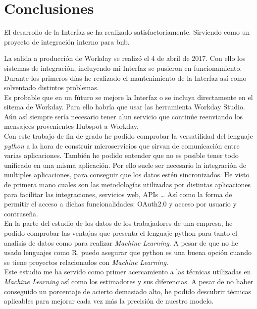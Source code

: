 \chapter{Conclusiones}

El desarrollo de la Interfaz se ha realizado satisfactoriamente. Sirviendo como un proyecto de integración interno para \acrshort{bnb}.

La salida a producción de Workday se realizó el 4 de abril de 2017. Con ello los sistemas de integración, incluyendo mi Interfaz se pusieron en funcionamiento.\\

Durante los primeros días he realizado el mantenimiento de la Interfaz así como solventado distintos problemas.\\

Es probable que en un fúturo se mejore la Interfaz o se incluya directamente en el sitema de Workday.
Para ello habría que usar las herramienta Workday Studio.
Aún así siempre sería necesario tener alun servicio que continúe reenviando los mensajees provenientes Hubspot a Workday. \\


Con este trabajo de fin de grado he podido comprobar la versatilidad del lenguaje \textit{python} a la hora de construir microservicios que sirvan de comunicación entre varias aplicaciones.
También he podido entender que no es posible tener todo unificado en una misma aplicación. Por ello suele ser necesario la integración de multiples aplicaciones, para conseguir que los datos estén sincronizados.
He visto de primera mano cuales son las metodologías utilizadas por distintas aplicaciones para facilitar las integraciones, servicios web, APIs \ldots
Así como la forma de permitir el acceso a dichas funcionalidades: OAuth2.0 y acceso por usuario y contraseña.\\



En la parte del estudio de los datos de los trabajadores de una empresa, he podido comprobar las ventajas que presenta el lenguaje python para tanto el analisis de datos como para realizar \textit{Machine Learning}.
A pesar de que no he usado lenguajes como R, puedo asegurar que python es una buena opción cuando se tiene proyectos relacionados con \textit{Machine Learning}.\\


Este estudio me ha servido como primer acercamiento a las técnicas utilizadas en \textit{Machine Learning} así como los estimadores y sus diferencias.
A pesar de no haber conseguido un porcentaje de acierto demasiado alto, he podido descubrir técnicas aplicables para mejorar cada vez más la precisión de nuestro modelo.\\




